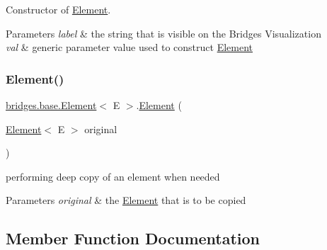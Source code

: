 Constructor of \mbox{\hyperlink{classbridges_1_1base_1_1_element}{Element}}. 


\begin{DoxyParams}{Parameters}
{\em label} & the string that is visible on the Bridges Visualization \\
\hline
{\em val} & generic parameter value used to construct \mbox{\hyperlink{classbridges_1_1base_1_1_element}{Element}} \\
\hline
\end{DoxyParams}
\mbox{\label{classbridges_1_1base_1_1_element_a91db9de70b65a1d7b5f27c1c0b909832}} 
\subsubsection{\texorpdfstring{Element()}{Element()}\hspace{0.1cm}{\footnotesize\ttfamily [4/4]}}
{\footnotesize\ttfamily \mbox{\hyperlink{classbridges_1_1base_1_1_element}{bridges.\+base.\+Element}}$<$ E $>$.\mbox{\hyperlink{classbridges_1_1base_1_1_element}{Element}} (\begin{DoxyParamCaption}\item[{\mbox{\hyperlink{classbridges_1_1base_1_1_element}{Element}}$<$ E $>$}]{original }\end{DoxyParamCaption})}



performing deep copy of an element when needed 


\begin{DoxyParams}{Parameters}
{\em original} & the \mbox{\hyperlink{classbridges_1_1base_1_1_element}{Element}} that is to be copied \\
\hline
\end{DoxyParams}


\subsection{Member Function Documentation}
\mbox{\label{classbridges_1_1base_1_1_element_a6cd4c4f15c6a4f87f59e443cffe87a20}} 
